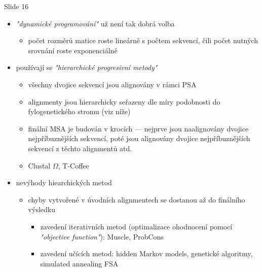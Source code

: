 \documentclass[DIV=8]{scrreprt}
\begin{document}
Slide 16
\begin{itemize}
    \item \emph{"dynamické programování"} už není tak dobrá volba
\begin{itemize}
    \item počet rozměrů matice roste lineárně s počtem sekvencí, čili počet nutných srovnání roste exponenciálně
\end{itemize}

    \item používají se \emph{"hierarchické progresivní metody"}
\begin{itemize}
    \item všechny dvojice sekvencí jsou alignovány v rámci PSA
    \item alignmenty jsou hierarchicky seřazeny dle míry podobnosti do fylogenetického stromu (viz níže)
    \item finální MSA je budován v krocích --- nejprve jsou naalignovány dvojice nejpříbuznějších sekvencí, poté jsou alignovány dvojice nejpříbuznějších sekvencí z těchto alignmentů atd.
    \item Clustal \(\Omega\), T-Coffee
\end{itemize}

    \item nevýhody hiearchických metod
\begin{itemize}
    \item chyby vytvořené v úvodních alignmentech se dostanou až do finálního výsledku
\begin{itemize}
    \item zavedení iterativních metod (optimalizace ohodnocení pomocí \emph{"objective function"}): Muscle, ProbCons
    \item zavedení učících metod: hidden Markov models, genetické algoritmy, simulated annealing FSA
\end{itemize}

\end{itemize}

\end{itemize}
\end{document}
